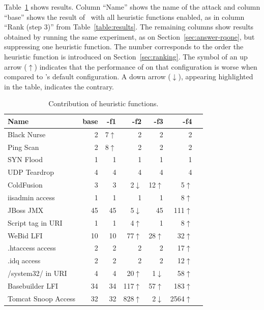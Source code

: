 \documentclass[sigconf,review, anonymous]{acmart}
\begin{document}
Table~\ref{table:weights} shows results. Column ``Name'' shows the
name of the attack and column ``base'' shows the result of
\tname\ with all heuristic functions enabled, as in column ``Rank
(step 3)'' from Table~\ref{table:results}. The remaining columns show
results obtained by running the same experiment, as on
Section~\ref{sec:answer-rqone}, but suppressing one heuristic
function. The number corresponds to the order the heuristic function
is introduced on Section~\ref{sec:ranking}. The symbol of an up arrow
($\uparrow$) indicates that the performance of \tname{} on that
configuration is worse when compared to \tname's default
configuration. A down arrow ($\downarrow$), appearing highlighted in
the table, indicates the contrary.

\setlength{\tabcolsep}{5pt}
\begin{table}[h!]
  \small
  \caption{\label{table:weights}Contribution of heuristic functions.}
  \vspace{-2ex}
  \centering
  \begin{tabular}{lrrrrrr}
    \toprule
    Name &
    base &
    -f1 &
    -f2 &    
    -f3 &
    -f4 \\
    \midrule
    Black Nurse & 2 & 7$\uparrow$ & 2 & 2 & 2 \\    
    Ping Scan & 2 &  8$\uparrow$& 2 & 2 & 2 \\
    SYN Flood & 1 & 1 & 1 & 1 & 1 \\
    UDP Teardrop & 4 & 4 & 4 & 4 & 4 \\
    \midrule
    ColdFusion & 3 & 3 & 2\cellcolor{lightgray}$\downarrow$ & 12$\uparrow$ & 5$\uparrow$ \\
    iisadmin access & 1  & 1 & 1 & 1 & 8$\uparrow$\\        
    JBoss JMX & 45 & 45 & 5\cellcolor{lightgray}$\downarrow$ & 45 & 111$\uparrow$ \\
    Script tag in URI & 1 & 1 & 4$\uparrow$ & 1 & 8$\uparrow$ \\
    WeBid LFI & 10 & 10 & 77$\uparrow$ & 28$\uparrow$ & 32$\uparrow$ \\    
    .htaccess access & 2  & 2 & 2 & 2 & 17$\uparrow$\\
    .idq access & 2  & 2 & 2 & 2 & 12$\uparrow$ \\
    /system32/ in URI & 4  & 4 & 20$\uparrow$ & 1\cellcolor{lightgray}$\downarrow$ & 58$\uparrow$\\
    Basebuilder LFI & 34  & 34 & 117$\uparrow$ & 57$\uparrow$ & 183$\uparrow$\\
    Tomcat Snoop Access & 32  & 32 & 828$\uparrow$ & 2\cellcolor{lightgray}$\downarrow$ & 2564$\uparrow$\\
    \bottomrule
  \end{tabular}
\end{table}
\end{document}
